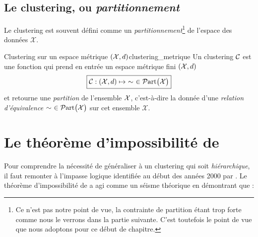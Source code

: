 

\subsection{Le clustering, ou \emph{partitionnement}} 
Le clustering est souvent défini comme un \emph{partitionnement}\footnote{Ce n'est pas notre point de vue, la contrainte de partition étant trop forte comme nous le verrons dans la partie suivante. C'est toutefois le point de vue que nous adoptons pour ce début de chapitre.} de l'espace des données $\mathcal X$.


\begin{Definition}{Clustering sur un espace métrique $\left( \mathcal{X}, d\right)$}{clustering_metrique}
Un clustering $\mathcal{C}$ est une fonction qui prend en entrée un espace métrique fini $\left( \mathcal{X}, d\right)$%
\[
\boxed{
    \mathcal{C} : \left(\mathcal{X}, d \right) \mapsto \ \sim \  \in \mathcal{P}\mathrm{art}\bigl( \mathcal{X} \bigr)
}
\]
et retourne une \emph{partition} de l'ensemble $\mathcal{X}$, c'est-à-dire la donnée d'une \emph{relation d'équivalence $\sim \ \in \mathcal{P}\mathrm{art}\bigl( \mathcal{X} \bigr)$} sur cet ensemble $\mathcal X$. 
\end{Definition}



\section{Le théorème d'impossibilité de }
\label{sec:Kleinberg}
Pour comprendre la nécessité de généraliser à un clustering qui soit \emph{hiérarchique}, il faut remonter à l'impasse logique identifiée au début des années 2000 par . Le théorème d'impossibilité de  \cite{Kleinberg2002} a agi comme un séisme théorique en démontrant que :


